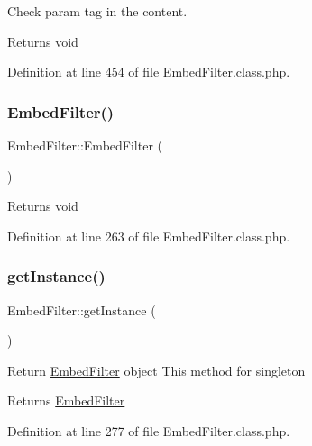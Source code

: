 Check param tag in the content. \begin{DoxyReturn}{Returns}
void 
\end{DoxyReturn}


Definition at line 454 of file Embed\+Filter.\+class.\+php.

\mbox{\label{classEmbedFilter_a62571fb9caf83a1ce168e20887709309}} 
\subsubsection{\texorpdfstring{Embed\+Filter()}{EmbedFilter()}}
{\footnotesize\ttfamily Embed\+Filter\+::\+Embed\+Filter (\begin{DoxyParamCaption}{ }\end{DoxyParamCaption})}

\begin{DoxyReturn}{Returns}
void 
\end{DoxyReturn}


Definition at line 263 of file Embed\+Filter.\+class.\+php.

\mbox{\label{classEmbedFilter_af8a43e4bc0161225381536c133792463}} 
\subsubsection{\texorpdfstring{get\+Instance()}{getInstance()}}
{\footnotesize\ttfamily Embed\+Filter\+::get\+Instance (\begin{DoxyParamCaption}{ }\end{DoxyParamCaption})}

Return \hyperlink{classEmbedFilter}{Embed\+Filter} object This method for singleton \begin{DoxyReturn}{Returns}
\hyperlink{classEmbedFilter}{Embed\+Filter} 
\end{DoxyReturn}


Definition at line 277 of file Embed\+Filter.\+class.\+php.

\mbox{\label{classEmbedFilter_ab67db1799d818d46e47006592b4e7695}} 
